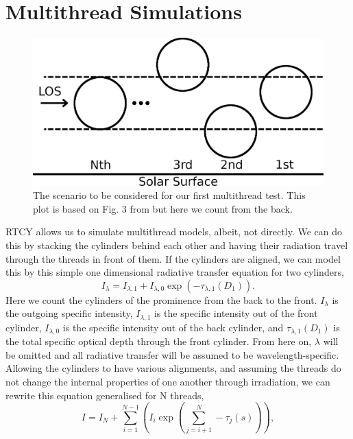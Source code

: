\section{Multithread Simulations}
\begin{figure}
    \centering
    \includegraphics*[width=0.8\linewidth]{./03Modelling2D/figs/lr2016_3_new.png}
    \caption[The scenario to be considered for our first multithread test.]{The scenario to be considered for our first multithread test. This plot is based on Fig. 3 from \cite{labrosse_radiative_2016} but here we count from the back.}
    \label{lr163}
\end{figure}
RTCY allows us to simulate multithread models, albeit, not directly. We can do this by stacking the cylinders behind each other and having their radiation travel through the threads in front of them. If the cylinders are aligned, we can model this by this simple one dimensional radiative transfer equation for  two cylinders,
\begin{equation}
    I_{\lambda}=I_{\lambda,1}+I_{\lambda,0}\exp\left(-\tau_{\lambda,1}(D_1)\right).
    \label{singlert}
\end{equation}
Here we count the cylinders of the prominence from the back to the front. $I_{\lambda}$ is the outgoing specific intensity, $I_{\lambda,1}$ is the specific intensity out of the front cylinder, $I_{\lambda,0}$ is the specific intensity out of the back cylinder, and $\tau_{\lambda,1}(D_1)$ is the total specific optical depth through the front cylinder. From here on, $\lambda$ will be omitted and all radiative transfer will be assumed to be wavelength-specific. Allowing the cylinders to have various alignments, and assuming the threads do not change the internal properties of one another through irradiation, we can rewrite this equation generalised for N threads,
\begin{equation}
    I=I_N+\sum_{i=1}^{N-1}\left(I_i\exp\left(\sum_{j=i+1}^{N}-\tau_j(s)\right)\right),
    \label{totalrt}
\end{equation}
